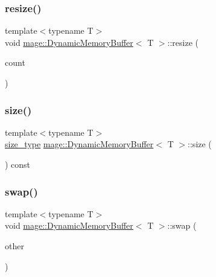 \subsubsection{\texorpdfstring{resize()}{resize()}}
{\footnotesize\ttfamily template$<$typename T$>$ \\
void \mbox{\hyperlink{classmage_1_1_dynamic_memory_buffer}{mage\+::\+Dynamic\+Memory\+Buffer}}$<$ T $>$\+::resize (\begin{DoxyParamCaption}\item[{\mbox{\hyperlink{classmage_1_1_dynamic_memory_buffer_a45d02825da2b18fd7c24965ed5f46a30}{size\+\_\+type}}}]{count }\end{DoxyParamCaption})}

\mbox{\label{classmage_1_1_dynamic_memory_buffer_a03cff83d88ddef07593b3864d384f77e}} 
\subsubsection{\texorpdfstring{size()}{size()}}
{\footnotesize\ttfamily template$<$typename T$>$ \\
\mbox{\hyperlink{classmage_1_1_dynamic_memory_buffer_a45d02825da2b18fd7c24965ed5f46a30}{size\+\_\+type}} \mbox{\hyperlink{classmage_1_1_dynamic_memory_buffer}{mage\+::\+Dynamic\+Memory\+Buffer}}$<$ T $>$\+::size (\begin{DoxyParamCaption}{ }\end{DoxyParamCaption}) const\hspace{0.3cm}{\ttfamily [noexcept]}}

\mbox{\label{classmage_1_1_dynamic_memory_buffer_a0d235c24e02e694f481a591dc803e508}} 
\subsubsection{\texorpdfstring{swap()}{swap()}}
{\footnotesize\ttfamily template$<$typename T$>$ \\
void \mbox{\hyperlink{classmage_1_1_dynamic_memory_buffer}{mage\+::\+Dynamic\+Memory\+Buffer}}$<$ T $>$\+::swap (\begin{DoxyParamCaption}\item[{\mbox{\hyperlink{classmage_1_1_dynamic_memory_buffer}{Dynamic\+Memory\+Buffer}}$<$ T $>$ \&}]{other }\end{DoxyParamCaption})\hspace{0.3cm}{\ttfamily [noexcept]}}



